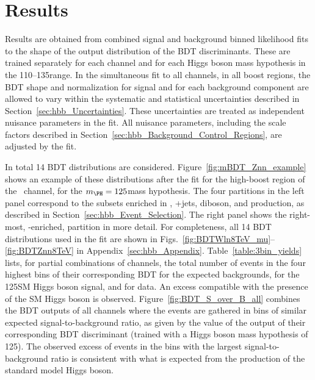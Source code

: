 \documentclass[11pt,twoside,a4paper,cmspaper,final,collab]{cms-tdr}
\begin{document}
\section{Results}\label{sec:hbb_Results}


Results are obtained from combined signal and
background binned likelihood fits to the shape of the output distribution of the BDT
discriminants. These are trained separately for each channel and for each Higgs
boson mass hypothesis in the 110--135\GeV range.
In the simultaneous fit to all channels, in all boost regions, the BDT shape and
normalization for signal and for each background component
are allowed to vary within the systematic and statistical uncertainties described in
Section~\ref{sec:hbb_Uncertainties}. These uncertainties are treated as independent nuisance
parameters in the fit. All nuisance parameters,
including the scale factors described in
Section~\ref{sec:hbb_Background_Control_Regions}, are adjusted
by the fit.


In total 14 BDT distributions are considered. Figure~\ref{fig:mBDT_Znn_example} shows an example of
these distributions after the fit for the high-boost region of the
\ZnnH\ channel, for the  $\mH=125$\GeV  mass
hypothesis. The four partitions in the left panel
correspond to the subsets enriched in \ttbar, {\Vvar}+jets,
diboson, and \VH production, as described in
Section~\ref{sec:hbb_Event_Selection}. The right panel shows
the right-most, \VH-enriched, partition in more detail. For
completeness, all 14 BDT distributions used in the fit are shown in Figs.~\ref{fig:BDTWln8TeV_mu}--\ref{fig:BDTZnn8TeV} in
Appendix~\ref{sec:hbb_Appendix}. Table~\ref{table:3bin_yields} lists, for partial combinations of channels,
the total number of events in the four highest bins of their
corresponding BDT for the expected backgrounds, for the
125\GeV SM Higgs boson signal, and for data. An excess compatible with
the presence of the SM Higgs boson is observed. Figure~\ref{fig:BDT_S_over_B_all}
combines the BDT outputs of all channels where the events
are gathered in bins of similar expected signal-to-background
ratio, as given by the value of the output of their corresponding BDT
discriminant (trained with a Higgs boson mass hypothesis of 125\GeV). The
observed excess of events in the bins with the largest
signal-to-background ratio is consistent with what is expected from
the production of the standard model Higgs boson.
\end{document}
